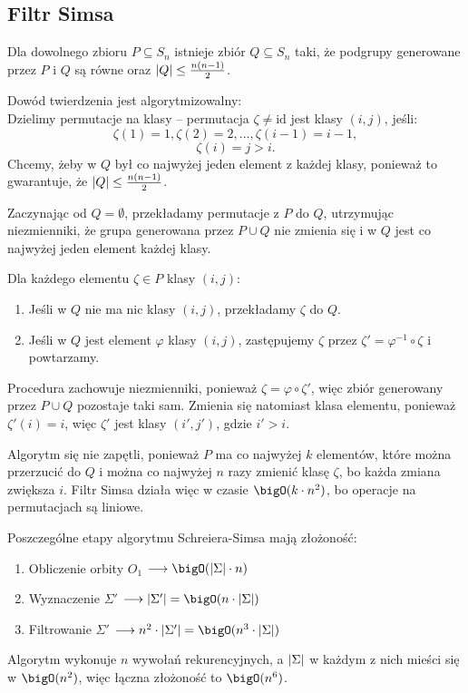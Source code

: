 \newpage
\subsection{Filtr Simsa}
\begin{theorem}
	Dla dowolnego zbioru \( P \subseteq S_n \) istnieje zbiór \( Q \subseteq S_n \) taki, że podgrupy generowane przez \(P\) i \(Q\) są równe oraz \( \left\lvert Q\right\rvert \leq \frac{n(n-1)}{2} \).
\end{theorem}
Dowód twierdzenia jest algorytmizowalny: \\
Dzielimy permutacje na klasy -- permutacja \(\zeta \neq \text{id}\) jest klasy \((i, j)\), jeśli:
\[
	\zeta(1) = 1, \zeta(2) = 2, \ldots, \zeta(i - 1) = i - 1,
\]
\[
	\zeta(i) = j > i.
\]
Chcemy, żeby w \( Q \) był co najwyżej jeden element z każdej klasy, ponieważ to gwarantuje, że \( \left\lvert Q\right\rvert \leq \frac{n(n-1)}{2} \).

Zaczynając od \(Q = \emptyset\), przekładamy permutacje z \(P\) do \(Q\), utrzymując niezmienniki, że grupa generowana przez \( P \cup Q \) nie zmienia się i w \( Q \) jest co najwyżej jeden element każdej klasy.

Dla każdego elementu \(\zeta \in P\) klasy \((i, j)\):
\begin{enumerate}
	\item Jeśli w \(Q\) nie ma nic klasy \((i, j)\), przekładamy \(\zeta\) do \(Q\).
	\item Jeśli w \(Q\) jest element \(\varphi\) klasy \((i, j)\), zastępujemy \(\zeta\) przez \(\zeta' = \varphi^{-1} \circ \zeta\) i powtarzamy.
\end{enumerate}
Procedura zachowuje niezmienniki, ponieważ \(\zeta = \varphi \circ \zeta'\), więc zbiór generowany przez \(P \cup Q\) pozostaje taki sam.
Zmienia się natomiast klasa elementu, ponieważ \(\zeta'(i) = i\), więc \(\zeta'\) jest klasy \((i', j')\), gdzie \(i' > i\).

Algorytm się nie zapętli, ponieważ \( P \) ma co najwyżej \(k\) elementów, które można przerzucić do \(Q\) i można co najwyżej \( n \) razy zmienić klasę \( \zeta \), bo każda zmiana zwiększa \( i \).
Filtr Simsa działa więc w czasie \(\bigO(k \cdot n^2)\), bo operacje na permutacjach są liniowe.

Poszczególne etapy algorytmu Schreiera-Simsa mają złożoność:
\begin{enumerate}
	\item Obliczenie orbity \(O_1\) \( \longrightarrow \bigO(\abs{\Sigma} \cdot n) \)
	\item Wyznaczenie \(\Sigma'\) \( \longrightarrow \abs{\Sigma'} = \bigO(n \cdot \abs{\Sigma}) \)
	\item Filtrowanie \(\Sigma'\) \( \longrightarrow n^2 \cdot \abs{\Sigma'} = \bigO(n^3 \cdot \abs{\Sigma}) \)
\end{enumerate}
Algorytm wykonuje \( n \) wywołań rekurencyjnych, a \( \left\lvert\Sigma\right\rvert \) w każdym z nich mieści się w \( \bigO(n^2) \), więc łączna złożoność to \( \bigO(n^6) \).